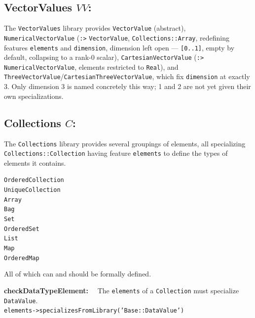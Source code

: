 \subsection{VectorValues $VV$:}\label{sec:vectorvalues}

The \texttt{VectorValues} library provides \texttt{VectorValue} (abstract), \texttt{NumericalVectorValue}
(\texttt{:>} \texttt{VectorValue}, \texttt{Collections::Array}, redefining features \texttt{elements} and
\texttt{dimension}, dimension left open --- \texttt{[0..1]}, empty by default, collapsing to a rank-0 scalar),
\texttt{CartesianVectorValue} (\texttt{:>} \texttt{NumericalVectorValue}, elements restricted to \texttt{Real}), and
\texttt{ThreeVectorValue}/\texttt{CartesianThreeVectorValue}, which fix \texttt{dimension} at exactly 3. Only
dimension 3 is named concretely this way; 1 and 2 are not yet given their own specializations.

\subsection{Collections $C$:}\label{sec:collections}

The \texttt{Collections} library provides several groupings of elements, all specializing \texttt{Collec\-tions::Collec\-tion} having feature \texttt{elements} to define the types of elements it contains.


\begin{description}
\item[\texttt{OrderedCollection} ] 
\item[\texttt{UniqueCollection} ] 
\item[\texttt{Array} ] 
\item[\texttt{Bag} ] 
\item[\texttt{Set} ] 
\item[\texttt{OrderedSet} ] 
\item[\texttt{List} ] 
\item[\texttt{Map} ] 
\item[\texttt{OrderedMap} ] 
\end{description}
All of which can and should be formally defined.

\textbf{}

\pn \textbf{checkDataTypeElement:}~~ The \texttt{elements} of a \texttt{Collection} must specialize \texttt{DataValue}.\\
\texttt{elements->specializesFromLibrary('Base::DataValue')}
